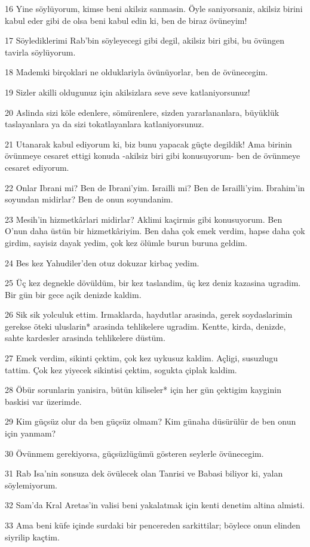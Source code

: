 \par 16 Yine söylüyorum, kimse beni akilsiz sanmasin. Öyle saniyorsaniz, akilsiz birini kabul eder gibi de olsa beni kabul edin ki, ben de biraz övüneyim!
\par 17 Söylediklerimi Rab'bin söyleyecegi gibi degil, akilsiz biri gibi, bu övüngen tavirla söylüyorum.
\par 18 Mademki birçoklari ne olduklariyla övünüyorlar, ben de övünecegim.
\par 19 Sizler akilli oldugunuz için akilsizlara seve seve katlaniyorsunuz!
\par 20 Aslinda sizi köle edenlere, sömürenlere, sizden yararlananlara, büyüklük taslayanlara ya da sizi tokatlayanlara katlaniyorsunuz.
\par 21 Utanarak kabul ediyorum ki, biz bunu yapacak güçte degildik! Ama birinin övünmeye cesaret ettigi konuda -akilsiz biri gibi konusuyorum- ben de övünmeye cesaret ediyorum.
\par 22 Onlar Ibrani mi? Ben de Ibrani'yim. Israilli mi? Ben de Israilli'yim. Ibrahim'in soyundan midirlar? Ben de onun soyundanim.
\par 23 Mesih'in hizmetkârlari midirlar? Aklimi kaçirmis gibi konusuyorum. Ben O'nun daha üstün bir hizmetkâriyim. Ben daha çok emek verdim, hapse daha çok girdim, sayisiz dayak yedim, çok kez ölümle burun buruna geldim.
\par 24 Bes kez Yahudiler'den otuz dokuzar kirbaç yedim.
\par 25 Üç kez degnekle dövüldüm, bir kez taslandim, üç kez deniz kazasina ugradim. Bir gün bir gece açik denizde kaldim.
\par 26 Sik sik yolculuk ettim. Irmaklarda, haydutlar arasinda, gerek soydaslarimin gerekse öteki uluslarin* arasinda tehlikelere ugradim. Kentte, kirda, denizde, sahte kardesler arasinda tehlikelere düstüm.
\par 27 Emek verdim, sikinti çektim, çok kez uykusuz kaldim. Açligi, susuzlugu tattim. Çok kez yiyecek sikintisi çektim, sogukta çiplak kaldim.
\par 28 Öbür sorunlarin yanisira, bütün kiliseler* için her gün çektigim kayginin baskisi var üzerimde.
\par 29 Kim güçsüz olur da ben güçsüz olmam? Kim günaha düsürülür de ben onun için yanmam?
\par 30 Övünmem gerekiyorsa, güçsüzlügümü gösteren seylerle övünecegim.
\par 31 Rab Isa'nin sonsuza dek övülecek olan Tanrisi ve Babasi biliyor ki, yalan söylemiyorum.
\par 32 Sam'da Kral Aretas'in valisi beni yakalatmak için kenti denetim altina almisti.
\par 33 Ama beni küfe içinde surdaki bir pencereden sarkittilar; böylece onun elinden siyrilip kaçtim.

